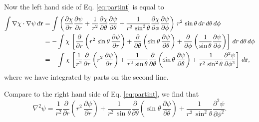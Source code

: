 \documentclass[11pt]{article}
\newcommand{\vct}[1]{\boldsymbol{\mathbf{#1}}}
\newcommand{\vr}{\vct{r}}
\begin{document}
Now the left hand side of Eq. \eqref{eq:partint}
is equal to
\begin{align*}
  \int \nabla \chi \cdot \nabla \psi \, d\vr
&=
  \int
  \left(
  \frac{\partial \chi}{\partial r}
  \frac{\partial \psi}{\partial r}
  +
  \frac{1}{r^2}
  \frac{\partial \chi}{\partial \theta}
  \frac{\partial \psi}{\partial \theta}
  +
  \frac{1}{r^2 \, \sin^2 \theta}
  \frac{\partial \chi}{\partial \phi}
  \frac{\partial \psi}{\partial \phi}
  \right)
  \, r^2 \, \sin\theta \, dr \, d\theta \, d\phi
\notag \\
&=
  -\int
  \chi \,
  \left[
    \frac{\partial}{\partial r}
    \left(
      r^2 \, \sin\theta \,
      \frac{\partial \psi}{\partial r}
    \right)
    +
    \frac{\partial}{\partial \theta}
    \left(
      \sin\theta \,
      \frac{\partial \psi}{\partial \theta}
    \right)
    +
    \frac{\partial}{\partial \phi}
    \left(
      \frac{1}{\sin\theta}
      \frac{\partial \psi}{\partial \phi}
    \right)
  \right]
  \, dr \, d\theta \, d\phi
\notag \\
&=
  -\int
  \chi \,
  \left[
    \frac{1}{r^2}
    \frac{\partial}{\partial r}
    \left(
      r^2 \,
      \frac{\partial \psi}{\partial r}
    \right)
    +
    \frac{1}{r^2 \, \sin\theta}
    \frac{\partial}{\partial \theta}
    \left(
      \sin\theta \,
      \frac{\partial \psi}{\partial \theta}
    \right)
    +
    \frac{1}{r^2 \, \sin^2\theta}
    \frac{\partial^2 \psi}{\partial \phi^2}
  \right]
  \, d\vr,
\end{align*}
where we have integrated by parts on the second line.

Compare to the right hand side of Eq. \eqref{eq:partint},
we find that
\begin{equation}
  \nabla^2\psi
=
  \frac{1}{r^2}
  \frac{\partial}{\partial r}
  \left(
    r^2 \,
    \frac{\partial \psi}{\partial r}
  \right)
  +
  \frac{1}{r^2 \, \sin\theta}
  \frac{\partial}{\partial \theta}
  \left(
    \sin\theta \,
    \frac{\partial \psi}{\partial \theta}
  \right)
  +
  \frac{1}{r^2 \, \sin^2\theta}
  \frac{\partial^2 \psi}{\partial \phi^2}.
  \label{eq:spcoords_laplacian}
\end{equation}





\end{document}
